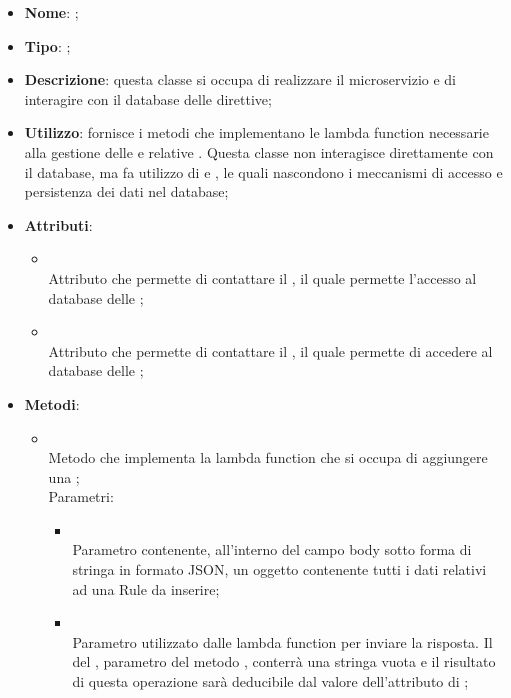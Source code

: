 \begin{itemize}
	\item \textbf{Nome}: ;
	\item \textbf{Tipo}: ;
	\item \textbf{Descrizione}: questa classe si occupa di realizzare il microservizio  e di interagire con il database delle direttive;
	\item \textbf{Utilizzo}: fornisce i metodi che implementano le lambda function necessarie alla gestione delle  e relative . Questa classe non interagisce direttamente con il database, ma fa utilizzo di  e , le quali nascondono i meccanismi di accesso e persistenza dei dati nel database;
	\item \textbf{Attributi}:
	\begin{itemize}
		\item[]  \\
		Attributo che permette di contattare il , il quale permette l'accesso al database delle ;
		\item[]  \\
		Attributo che permette di contattare il , il quale permette di accedere al database delle ;
	\end{itemize}
	\item \textbf{Metodi}:
	\begin{itemize}
		\item[]  \\
		Metodo che implementa la lambda function che si occupa di aggiungere una ;\\
		Parametri:
		\begin{itemize}
			\item {} \\
			Parametro contenente, all'interno del campo body sotto forma di stringa in formato JSON, un oggetto  contenente tutti i dati relativi ad una Rule da inserire;
			\item {} \\
			Parametro utilizzato dalle lambda function per inviare la risposta. Il  del , parametro del metodo , conterrà una stringa vuota e il risultato di questa operazione sarà deducibile dal valore dell'attributo di ;

\end{itemize}
\end{itemize}
\end{itemize}
